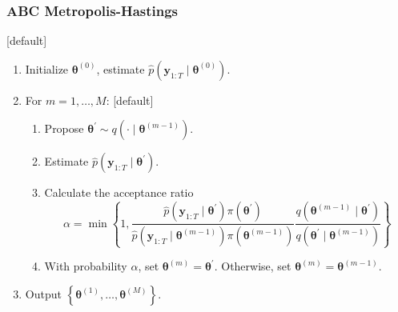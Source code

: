 \documentclass{beamer}
\newcommand{\by}{\bm{y}}
\newcommand{\btheta}{\bm{\theta}}
\newcommand{\pprior}{\pi}
\begin{document}
    \begin{frame}[noframenumbering]
    \frametitle{ABC Metropolis-Hastings}
    [default]
    \begin{enumerate}
        \item Initialize $\btheta^{(0)}$, estimate $\widehat{p}(\by_{1:T} \mid \btheta^{(0)})$.
        \item For $m = 1, \ldots, M$:
        [default]
        \begin{enumerate}
            \item Propose $\btheta^\prime \sim q(\cdot \mid \btheta^{(m-1)})$.
            \item Estimate $\widehat{p}(\by_{1:T} \mid \btheta^\prime)$.
            \item Calculate the acceptance ratio
            \begin{equation*}
            \alpha = \min \left\{1, \frac{\widehat{p}(\by_{1:T} \mid \btheta^\prime) \pprior(\btheta^\prime)}{\widehat{p}(\by_{1:T} \mid \btheta^{(m-1)}) \pprior(\btheta^{(m-1)})} \frac{q(\btheta^{(m-1)} \mid \btheta^\prime)}{q(\btheta^\prime \mid \btheta^{(m-1)})} \right\}
            \end{equation*}
            \item With probability $\alpha$, set $\btheta^{(m)} = \btheta^\prime$. Otherwise, set $\btheta^{(m)} = \btheta^{(m-1)}$.
        \end{enumerate}
        \item Output $\left\{ \btheta^{(1)}, \ldots, \btheta^{(M)} \right\}$.
    \end{enumerate}
    \end{frame}
\end{document}
